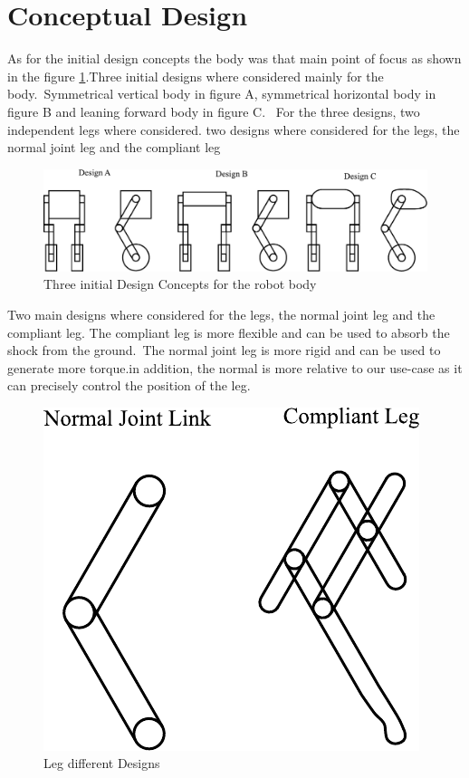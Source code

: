 \section{Conceptual Design}
As for the initial design concepts the body was that main point of focus as shown in the figure \ref{fig:initialdesigns}.Three initial designs where considered mainly for the body.\ Symmetrical vertical body in figure A, symmetrical horizontal body in figure B and leaning forward body in figure C.
\ For the three designs, two independent legs where considered.
two designs where considered for the legs, the normal joint leg and the compliant leg

\begin{figure}[h]
	\centering
	\includegraphics[width=1\linewidth]{Conceptual Design}
	\caption[Initial Design Concepts TEST]{Three initial Design Concepts for the robot body}
	\label{fig:initialdesigns}
\end{figure}


Two main designs where considered for the legs, the normal joint leg and the compliant leg. The compliant leg is more flexible and can be used to absorb the shock from the ground.\ The normal joint leg is more rigid and can be used to generate more torque.in addition, the normal is more relative to our use-case as it can precisely control the position of the leg.


\begin{figure}[h]
	\centering
	\includegraphics[width=0.4\linewidth]{Leg Design}
	\caption[between brakets for leg design]{Leg different Designs }
	\label{fig:legdesignsjbhi}
\end{figure}




